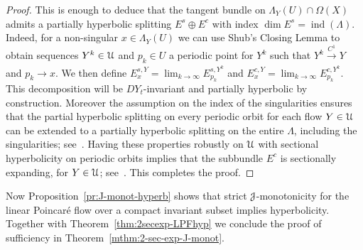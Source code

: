 \documentclass[12pt,reqno]{amsart}
\numberwithin{equation}{section}
\theoremstyle{plain}
\theoremstyle{definition}
\renewcommand{\epsilon}{\varepsilon}
\newcommand{\indi}{\operatorname{ind}}
\newcommand{\U}{\EuScript{U}}
\newcommand{\J}{\EuScript{J}}
\begin{document}
\begin{proof}
  This is enough to deduce that the tangent bundle on
  $\Lambda_Y(U)\cap\Omega(X)$ admits a partially
  hyperbolic splitting $E^s\oplus E^c$ with index $\dim
  E^s=\indi(\Lambda)$. Indeed, for a non-singular
  $x\in\Lambda_Y(U)$ we can use Shub's Closing Lemma to
  obtain sequences $Y^k\in\U$ and $p_k\in U$ a periodic
  point for $Y^k$ such that $Y^k\xrightarrow[]{C^1}Y$
  and $p_k\to x$. We then define $ E^{s,Y}_x = \lim_{k
    \rightarrow\infty}E^{s,Y^{k}}_{p_k}$ and
  $E^{c,Y}_x= \lim_{k \rightarrow
    \infty}E^{c,Y^{k}}_{p_{k}}.$ This decomposition
  will be $DY_t$-invariant and partially hyperbolic by
  construction.  Moreover the assumption on the index
  of the singularities ensures that the partial
  hyperbolic splitting on every periodic orbit for each
  flow $Y\in\U$ can be extended to a partially
  hyperbolic splitting on the entire $\Lambda$,
  including the singularities; see~\cite[Section
  5.4.2]{AraPac2010}. Having these properties robustly
  on $\U$ with sectional hyperbolicity on periodic
  orbits implies that the subbundle $E^c$ is
  sectionally expanding, for $Y\in\U$;
  see~\cite[Section 5.4.3]{AraPac2010}.  This completes
  the proof.
\end{proof}

Now Proposition~\ref{pr:J-monot-hyperb} shows that strict
$\J$-monotonicity for the linear Poincar\'e flow over a
compact invariant subset implies hyperbolicity. Together
with Theorem~\ref{thm:2secexp-LPFhyp} we conclude the proof
of sufficiency in Theorem~\ref{mthm:2-sec-exp-J-monot}.%



\end{document}
